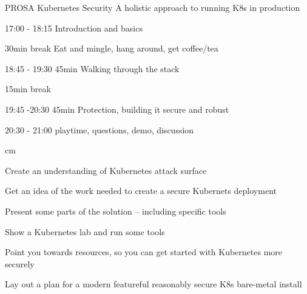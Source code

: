 \documentclass[Screen16to9,17pt]{foils}
\begin{document}
{}

\mytitlepage
{PROSA Kubernetes Security}
{A holistic approach to running K8s in production}
\LogoOn


\begin{list2}
\item 17:00 - 18:15  Introduction and basics\\

\item 30min break  Eat and mingle, hang around, get coffee/tea\\

\item 18:45 - 19:30 45min Walking through the stack\\

\item 15min break\\

\item 19:45 -20:30 45min Protection, building it secure and robust \\

\item 20:30 - 21:00 playtime, questions, demo, discussion
\end{list2}

\hlkprofiluk

 cm


\begin{list2}
\item Create an understanding of Kubernetes attack surface
\item Get an idea of the work needed to create a secure Kubernets deployment
\item Present some parts of the solution -- including specific tools \faWrench
\item Show a Kubernetes lab and run some tools
\item Point you towards resources, so you can get started with Kubernetes more securely
\item Lay out a plan for a modern featureful reasonably secure K8s bare-metal install
\end{list2}


\end{document}
